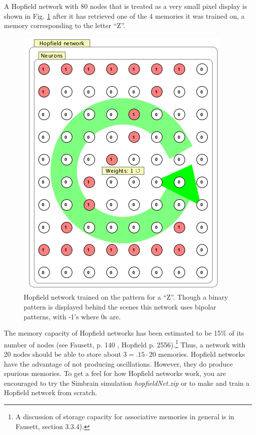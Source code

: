 A Hopfield network with 80 nodes that is treated as a very small pixel display is shown in Fig. \ref{F:hopfield} after it has retrieved one of the 4 memories it was trained on, a memory corresponding to the letter ``Z''.

\begin{figure}[h]
\centering
\includegraphics[scale=.4]{./images/Hopfield.png}
\caption[Simbrain screenshot]{Hopfield network trained on the pattern for a ``Z''. Though a binary pattern is displayed behind the scenes this network uses bipolar patterns, with -1's where 0s are.}
\label{F:hopfield}
\end{figure}

The memory capacity of Hopfield networks has been estimated to be 15\%  of its number of nodes (see Fausett, p. 140 \cite{fausett1994fundamentals}, Hopfield p. 2556).\footnote{A discussion of storage capacity for associative memories in general is in Fausett, section 3.3.4).}  Thus, a network with 20 nodes should be able to store about $3 = .15 \cdot 20$ memories. Hopfield networks have the advantage of not producing oscillations. However, they do produce spurious memories. To get a feel for how Hopfield networks work, you are encouraged to try the Simbrain simulation \emph{hopfieldNet.zip} or to make and train a Hopfield network from scratch. 
